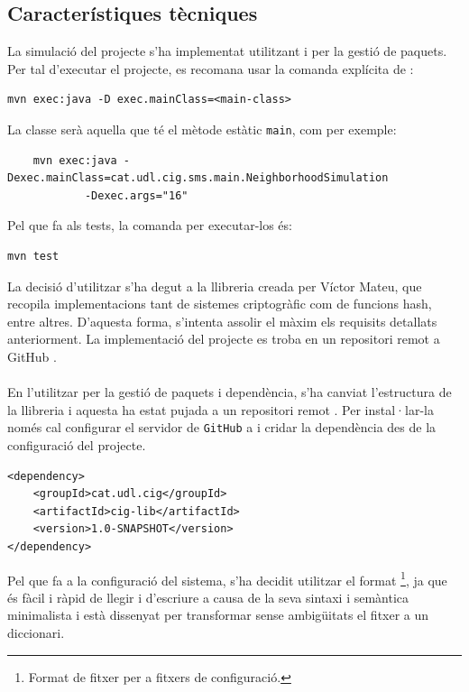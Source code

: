 \subsection{Característiques tècniques}
La simulació del projecte s'ha implementat utilitzant \texttt{\java} i \texttt{\mavenLarge} per la gestió de paquets. Per tal d'executar el projecte, es recomana usar la comanda explícita de \maven:
\begin{verbatim}
mvn exec:java -D exec.mainClass=<main-class>
\end{verbatim}
La classe serà aquella que té el mètode estàtic \texttt{main}, com per exemple:
\begin{verbatim}
	mvn exec:java -Dexec.mainClass=cat.udl.cig.sms.main.NeighborhoodSimulation 
	        -Dexec.args="16"
\end{verbatim}
Pel que fa als tests, la comanda per executar-los és:
\begin{verbatim}
mvn test
\end{verbatim}
La decisió d'utilitzar \texttt{\java} s'ha degut a la llibreria \ciglib creada per Víctor Mateu, que recopila implementacions tant de sistemes criptogràfic com de funcions hash, entre altres. D'aquesta forma, s'intenta assolir el màxim els requisits detallats anteriorment. La implementació del projecte es troba en un repositori remot a GitHub \cite{smart}.
\\
\\
En l'utilitzar \maven per la gestió de paquets i dependència, s'ha canviat l'estructura de la llibreria i aquesta ha estat pujada a un repositori remot \cite{ciglib}. Per instal·lar-la només cal configurar el servidor de \texttt{GitHub} a \maven i cridar la dependència des de la configuració del projecte.
\lstset{language=xml}
\begin{lstlisting}
<dependency>
	<groupId>cat.udl.cig</groupId>
	<artifactId>cig-lib</artifactId>
	<version>1.0-SNAPSHOT</version>
</dependency>
\end{lstlisting}
Pel que fa a la configuració del sistema, s'ha decidit utilitzar el format \toml\footnote{Format de fitxer per a fitxers de configuració.}, ja que és fàcil i ràpid de llegir i d'escriure a causa de la seva sintaxi i semàntica minimalista i està dissenyat per transformar sense ambigüitats el fitxer a un diccionari.
